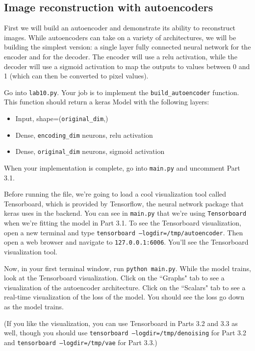\documentclass{article}
\begin{document}
\subsection{Image reconstruction with autoencoders}

First we will build an autoencoder and demonstrate its ability to reconstruct images. While autoencoders can take on a variety of architectures, we will be building the simplest version: a single layer fully connected neural network for the encoder and for the decoder. The encoder will use a relu activation, while the decoder will use a sigmoid activation to map the outputs to values between 0 and 1 (which can then be converted to pixel values).

Go into \texttt{lab10.py}. Your job is to implement the \texttt{build\_autoencoder} function. This function should return a keras Model with the following layers:

\begin{itemize}
    \item Input, shape=(\texttt{original\_dim},)
    
    \item Dense, \texttt{encoding\_dim} neurons, relu activation
    
    \item Dense, \texttt{original\_dim} neurons, sigmoid activation
\end{itemize}

When your implementation is complete, go into \texttt{main.py} and uncomment Part 3.1.

Before running the file, we're going to load a cool visualization tool called Tensorboard, which is provided by Tensorflow, the neural network package that keras uses in the backend. You can see in \texttt{main.py} that we're using \texttt{Tensorboard} when we're fitting the model in Part 3.1. To see the Tensorboard visualization, open a new terminal and type \texttt{tensorboard --logdir=/tmp/autoencoder}. Then open a web browser and navigate to \texttt{127.0.0.1:6006}. You'll see the Tensorboard visualization tool.

Now, in your first terminal window, run \texttt{python main.py}. While the model trains, look at the Tensorboard visualization. Click on the ``Graphs" tab to see a visualization of the autoencoder architecture. Click on the ``Scalars" tab to see a real-time visualization of the loss of the model. You should see the loss go down as the model trains.

(If you like the visualization, you can use Tensorboard in Parts 3.2 and 3.3 as well, though you should use \texttt{tensorboard --logdir=/tmp/denoising} for Part 3.2 and \texttt{tensorboard --logdir=/tmp/vae} for Part 3.3.)
\end{document}
